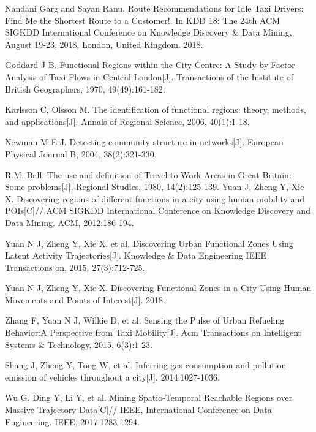\documentclass[runningheads]{llncs}
\begin{document}
\begin{thebibliography}{25}
Nandani Garg and Sayan Ranu. Route Recommendations for Idle Taxi Drivers: Find Me the Shortest Route to a Customer!. In KDD 18: The 24th ACM SIGKDD International Conference on Knowledge Discovery \& Data Mining, August 19-23, 2018, London, United Kingdom. 2018.

Goddard J B. Functional Regions within the City Centre: A Study by Factor Analysis of Taxi Flows in Central London[J]. Transactions of the Institute of British Geographers, 1970, 49(49):161-182.
 
Karlsson C, Olsson M. The identification of functional regions: theory, methods, and applications[J]. Annals of Regional Science, 2006, 40(1):1-18.
   
Newman M E J. Detecting community structure in networks[J]. European Physical Journal B, 2004, 38(2):321-330.
   
R.M. Ball. The use and definition of Travel-to-Work Areas in Great Britain: Some problems[J]. Regional Studies, 1980, 14(2):125-139.
Yuan J, Zheng Y, Xie X. Discovering regions of different functions in a city using human mobility and POIs[C]// ACM SIGKDD International Conference on Knowledge Discovery and Data Mining. ACM, 2012:186-194.

Yuan N J, Zheng Y, Xie X, et al. Discovering Urban Functional Zones Using Latent Activity Trajectories[J]. Knowledge \& Data Engineering IEEE Transactions on, 2015, 27(3):712-725.
  
Yuan N J, Zheng Y, Xie X. Discovering Functional Zones in a City Using Human Movements and Points of Interest[J]. 2018.

Zhang F, Yuan N J, Wilkie D, et al. Sensing the Pulse of Urban Refueling Behavior:A Perspective from Taxi Mobility[J]. Acm Transactions on Intelligent Systems \& Technology, 2015, 6(3):1-23.
 
Shang J, Zheng Y, Tong W, et al. Inferring gas consumption and pollution emission of vehicles throughout a city[J]. 2014:1027-1036.

Wu G, Ding Y, Li Y, et al. Mining Spatio-Temporal Reachable Regions over Massive Trajectory Data[C]// IEEE, International Conference on Data Engineering. IEEE, 2017:1283-1294.
 

\end{thebibliography}
\end{document}
